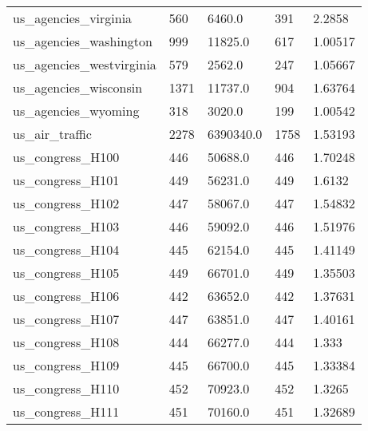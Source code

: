 \begin{longtable}{lllll}
 us\_agencies\_virginia                               & 560        & 6460.0      & 391   & 2.2858     \\
 us\_agencies\_washington                             & 999        & 11825.0     & 617   & 1.00517    \\
 us\_agencies\_westvirginia                           & 579        & 2562.0      & 247   & 1.05667    \\
 us\_agencies\_wisconsin                              & 1371       & 11737.0     & 904   & 1.63764    \\
 us\_agencies\_wyoming                                & 318        & 3020.0      & 199   & 1.00542    \\
 us\_air\_traffic                                     & 2278       & 6390340.0   & 1758  & 1.53193    \\
 us\_congress\_H100                                   & 446        & 50688.0     & 446   & 1.70248    \\
 us\_congress\_H101                                   & 449        & 56231.0     & 449   & 1.6132     \\
 us\_congress\_H102                                   & 447        & 58067.0     & 447   & 1.54832    \\
 us\_congress\_H103                                   & 446        & 59092.0     & 446   & 1.51976    \\
 us\_congress\_H104                                   & 445        & 62154.0     & 445   & 1.41149    \\
 us\_congress\_H105                                   & 449        & 66701.0     & 449   & 1.35503    \\
 us\_congress\_H106                                   & 442        & 63652.0     & 442   & 1.37631    \\
 us\_congress\_H107                                   & 447        & 63851.0     & 447   & 1.40161    \\
 us\_congress\_H108                                   & 444        & 66277.0     & 444   & 1.333      \\
 us\_congress\_H109                                   & 445        & 66700.0     & 445   & 1.33384    \\
 us\_congress\_H110                                   & 452        & 70923.0     & 452   & 1.3265     \\
 us\_congress\_H111                                   & 451        & 70160.0     & 451   & 1.32689    \\

\end{longtable}
